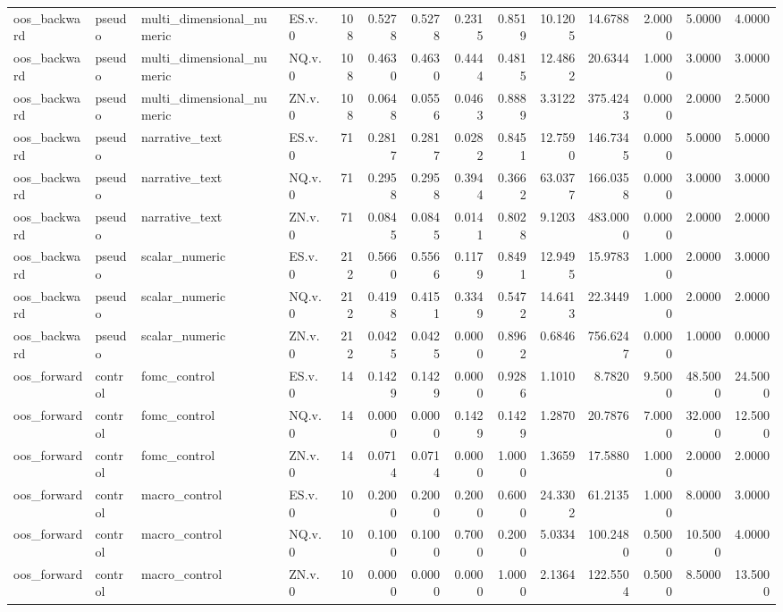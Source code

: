 \begin{tabular}{llllrrrrrrrrrr}
oos_backward & pseudo & multi_dimensional_numeric & ES.v.0 & 108 & 0.5278 & 0.5278 & 0.2315 & 0.8519 & 10.1205 & 14.6788 & 2.0000 & 5.0000 & 4.0000 \\
oos_backward & pseudo & multi_dimensional_numeric & NQ.v.0 & 108 & 0.4630 & 0.4630 & 0.4444 & 0.4815 & 12.4862 & 20.6344 & 1.0000 & 3.0000 & 3.0000 \\
oos_backward & pseudo & multi_dimensional_numeric & ZN.v.0 & 108 & 0.0648 & 0.0556 & 0.0463 & 0.8889 & 3.3122 & 375.4243 & 0.0000 & 2.0000 & 2.5000 \\
oos_backward & pseudo & narrative_text & ES.v.0 & 71 & 0.2817 & 0.2817 & 0.0282 & 0.8451 & 12.7590 & 146.7345 & 0.0000 & 5.0000 & 5.0000 \\
oos_backward & pseudo & narrative_text & NQ.v.0 & 71 & 0.2958 & 0.2958 & 0.3944 & 0.3662 & 63.0377 & 166.0358 & 0.0000 & 3.0000 & 3.0000 \\
oos_backward & pseudo & narrative_text & ZN.v.0 & 71 & 0.0845 & 0.0845 & 0.0141 & 0.8028 & 9.1203 & 483.0000 & 0.0000 & 2.0000 & 2.0000 \\
oos_backward & pseudo & scalar_numeric & ES.v.0 & 212 & 0.5660 & 0.5566 & 0.1179 & 0.8491 & 12.9495 & 15.9783 & 1.0000 & 2.0000 & 3.0000 \\
oos_backward & pseudo & scalar_numeric & NQ.v.0 & 212 & 0.4198 & 0.4151 & 0.3349 & 0.5472 & 14.6413 & 22.3449 & 1.0000 & 2.0000 & 2.0000 \\
oos_backward & pseudo & scalar_numeric & ZN.v.0 & 212 & 0.0425 & 0.0425 & 0.0000 & 0.8962 & 0.6846 & 756.6247 & 0.0000 & 1.0000 & 0.0000 \\
oos_forward & control & fomc_control & ES.v.0 & 14 & 0.1429 & 0.1429 & 0.0000 & 0.9286 & 1.1010 & 8.7820 & 9.5000 & 48.5000 & 24.5000 \\
oos_forward & control & fomc_control & NQ.v.0 & 14 & 0.0000 & 0.0000 & 0.1429 & 0.1429 & 1.2870 & 20.7876 & 7.0000 & 32.0000 & 12.5000 \\
oos_forward & control & fomc_control & ZN.v.0 & 14 & 0.0714 & 0.0714 & 0.0000 & 1.0000 & 1.3659 & 17.5880 & 1.0000 & 2.0000 & 2.0000 \\
oos_forward & control & macro_control & ES.v.0 & 10 & 0.2000 & 0.2000 & 0.2000 & 0.6000 & 24.3302 & 61.2135 & 1.0000 & 8.0000 & 3.0000 \\
oos_forward & control & macro_control & NQ.v.0 & 10 & 0.1000 & 0.1000 & 0.7000 & 0.2000 & 5.0334 & 100.2480 & 0.5000 & 10.5000 & 4.0000 \\
oos_forward & control & macro_control & ZN.v.0 & 10 & 0.0000 & 0.0000 & 0.0000 & 1.0000 & 2.1364 & 122.5504 & 0.5000 & 8.5000 & 13.5000 \\

\end{tabular}
